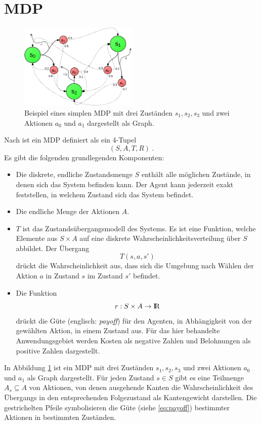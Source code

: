 \documentclass[a4paper]{IEEEtran}
\def\IR{\mathrm{I\hspace{-2pt}R}} %
\begin{document}
\section{MDP}
\begin{figure}[ht]
	\centering
	\includegraphics[width=0.5\textwidth]{images/MDP_example.png}
	\caption{Beispiel eines simplen MDP mit drei Zuständen $s_1, s_2, s_3$ und zwei Aktionen $a_0$ und $a_1$ dargestellt als Graph.}
	\label{fig:MDP_example} %
\end{figure}
Nach \cite{cassandra1995acting} ist ein MDP definiert als ein 4-Tupel
\begin{equation}
	(S, A, T, R) \ .
\end{equation}
Es gibt die folgenden grundlegenden Komponenten:
\begin{itemize}
	\item Die diskrete, endliche Zustandsmenge $S$ enthält alle möglichen Zustände, in denen sich das System befinden kann. Der Agent kann jederzeit exakt feststellen, in welchem Zustand sich das System befindet.
	\item Die endliche Menge der Aktionen $A$.
	\item $T$ ist das Zustandsübergangsmodell des Systems. Es ist eine Funktion, welche Elemente aus $S \times A$ auf eine diskrete Wahrscheinlichkeitsverteilung über $S$ abbildet. Der Übergang
	\begin{equation}
		T(s, a, s')
	\end{equation}
	drückt die Wahrscheinlichkeit aus, dass sich die Umgebung nach Wählen der Aktion $a$ in Zustand $s$ im Zustand $s'$ befindet.
	\item Die Funktion
	\begin{equation}
		r: S \times A \rightarrow \IR
		\label{eq:payoff}
	\end{equation}
	drückt die Güte (englisch: \emph{payoff}) für den Agenten, in Abhängigkeit von der gewählten Aktion, in einem Zustand aus. Für das hier behandelte Anwendungsgebiet werden Kosten als negative Zahlen und Belohnungen als positive Zahlen dargestellt.
\end{itemize}
In Abbildung \ref{fig:MDP_example} ist ein MDP mit drei Zuständen $s_1, s_2, s_3$ und zwei Aktionen $a_0$ und $a_1$ als Graph dargestellt. Für jeden Zustand $s \in S$ gibt es eine Teilmenge $A_s \subseteq A$ von Aktionen, von denen ausgehende Kanten die Wahrscheinlichkeit des Übergangs in den entsprechenden Folgezustand als Kantengewicht darstellen. Die gestrichelten Pfeile symbolisieren die Güte (siehe \ref{eq:payoff}) bestimmter Aktionen in bestimmten Zuständen.
\end{document}
